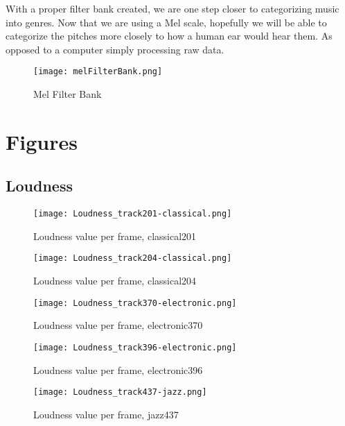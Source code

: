 \documentclass{article} %
\begin{document}
With a proper filter bank created, we are one step closer to categorizing music into genres. Now that we are using a Mel scale, hopefully we will be able to categorize the pitches
more closely to how a human ear would hear them. As opposed to a computer simply processing raw data. 

\begin{figure}[H]
\centering
\texttt{[image: melFilterBank.png]}
\caption{Mel Filter Bank}
\label{fig:mel_Bank}
\end{figure}







\clearpage
\appendix
\section{Figures}
\subsection{Loudness}
\label{sec:LoudnessFigures}

\begin{figure}[h]
\centering
\texttt{[image: Loudness\_track201-classical.png]}
\caption{Loudness value per frame, classical201}
\label{fig:loudness_201}
\end{figure}

\begin{figure}
\centering
\vspace{-400em}
\texttt{[image: Loudness\_track204-classical.png]}
\caption{Loudness value per frame, classical204}
\label{fig:loudness_204}
\end{figure}

\begin{figure}
\centering
\texttt{[image: Loudness\_track370-electronic.png]}
\caption{Loudness value per frame, electronic370}
\label{fig:loudness_370}
\end{figure}

\begin{figure}
\centering
\texttt{[image: Loudness\_track396-electronic.png]}
\caption{Loudness value per frame, electronic396}
\label{fig:loudness_396}
\end{figure}

\begin{figure}
\centering
\texttt{[image: Loudness\_track437-jazz.png]}
\caption{Loudness value per frame, jazz437}
\label{fig:loudness_437}
\end{figure}
\end{document}
